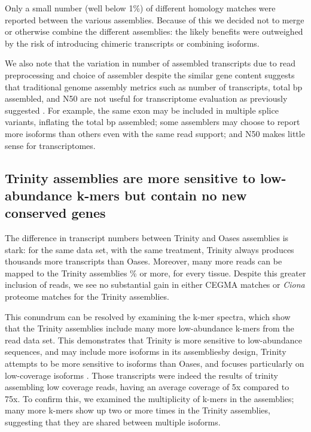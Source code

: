 \documentclass[fleqn,10pt]{wlpeerj}
\begin{document}
Only a small number (well below 1\%) of different homology matches were reported between the various assemblies.  Because of this we decided not to merge or otherwise combine the different assemblies: the likely benefits were outweighed by the risk of introducing chimeric transcripts or combining isoforms.

We also note that the variation in number of assembled transcripts due to read preprocessing and choice of assembler despite the similar gene content suggests that traditional genome assembly metrics such as number of transcripts, total bp assembled, and N50 are not useful for transcriptome evaluation as previously suggested \citep{oneil_assessing_2013}.  For example, the same exon may be included in multiple splice variants, inflating the total bp assembled; some assemblers may choose to report more isoforms than others even with the same read support; and N50 makes little sense for transcriptomes.
 
\subsection{Trinity assemblies are more sensitive to low-abundance k-mers but contain no new conserved genes}
The difference in transcript numbers between Trinity and Oases assemblies is stark: for the same data set, with the same treatment, Trinity always produces thousands more transcripts than Oases.  Moreover, many more reads can be mapped to the Trinity assemblies \% or more, for every tissue.  Despite this greater inclusion of reads, we see no substantial gain in either CEGMA matches or \textit{Ciona} proteome matches for the Trinity assemblies.

This conundrum can be resolved by examining the k-mer spectra, which show that the Trinity assemblies include many more low-abundance k-mers from the read data set.  This demonstrates that Trinity is more sensitive to low-abundance sequences, and may include more isoforms in its assemblies\textemdash by design, Trinity attempts to be more sensitive to isoforms than Oases, and focuses particularly on low-coverage isoforms \citep{vijay_challenges_2012, grabherr_full-length_2011, van_belleghem_novo_2012}. Those transcripts were indeed the results of trinity assembling low coverage reads, having an average coverage of 5x compared to 75x. To confirm this, we examined the multiplicity of k-mers in the assemblies; many more k-mers show up two or more times in the Trinity assemblies, suggesting that they are shared between multiple isoforms.
 
\end{document}

